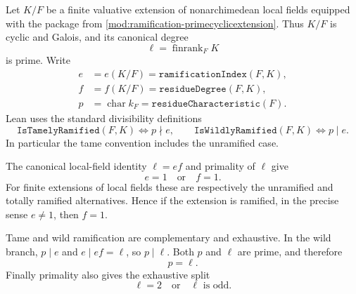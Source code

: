 \begin{theorem}\label{mod:ramification-primedegreedichotomy}
Let $K/F$ be a finite valuative extension of nonarchimedean local fields
equipped with the package from
\ref{mod:ramification-primecyclicextension}.  Thus $K/F$ is cyclic and
Galois, and its canonical degree
\[
  \ell=\operatorname{finrank}_F K
\]
is prime.  Write
\[
 \begin{aligned}
  e&=e(K/F)=\texttt{ramificationIndex}(F,K),\\
  f&=f(K/F)=\texttt{residueDegree}(F,K),\\
  p&=\operatorname{char}k_F=\texttt{residueCharacteristic}(F).
 \end{aligned}
\]
Lean uses the standard divisibility definitions
\[
 \texttt{IsTamelyRamified}(F,K)\iff p\nmid e,
 \qquad
 \texttt{IsWildlyRamified}(F,K)\iff p\mid e.
\]
In particular the tame convention includes the unramified case.

The canonical local-field identity $\ell=ef$ and primality of $\ell$
give
\[
  e=1\quad\text{or}\quad f=1.
\]
For finite extensions of local fields these are respectively the
unramified and totally ramified alternatives.  Hence if the extension is
ramified, in the precise sense $e\ne1$, then $f=1$.

Tame and wild ramification are complementary and exhaustive.  In the
wild branch, $p\mid e$ and $e\mid ef=\ell$, so $p\mid\ell$.  Both $p$ and
$\ell$ are prime, and therefore
\[
  p=\ell.
\]
Finally primality also gives the exhaustive split
\[
  \ell=2\quad\text{or}\quad \ell\text{ is odd}.
\]


\end{theorem}
